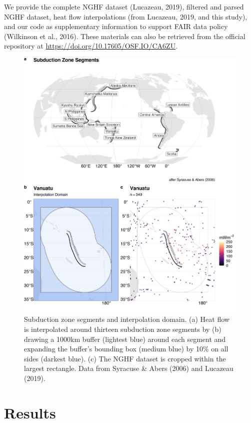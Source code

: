 \documentclass[draft,linenumbers]{agujournal2018}
\begin{document}
We provide the complete NGHF dataset (Lucazeau, 2019), filtered and
parsed NGHF dataset, heat flow interpolations (from Lucazeau, 2019, and
this study), and our code as supplementary information to support FAIR
data policy (Wilkinson et al., 2016). These materials can also be
retrieved from the official repository at
\url{https://doi.org/10.17605/OSF.IO/CA6ZU}.

\begin{figure}[h]

{\centering \includegraphics[width=0.9\linewidth,]{../figs/base/segs_comp} 

}

\caption{Subduction zone segments and interpolation domain. (a) Heat flow is interpolated around thirteen subduction zone segments by (b) drawing a 1000km buffer (lightest blue) around each segment and expanding the buffer's bounding box (medium blue) by 10\% on all sides (darkest blue). (c) The NGHF dataset is cropped within the largest rectangle. Data from Syracuse \& Abers (2006) and Lucazeau (2019).}\label{fig:segments}
\end{figure}

\clearpage

\section{Results}
\end{document}
